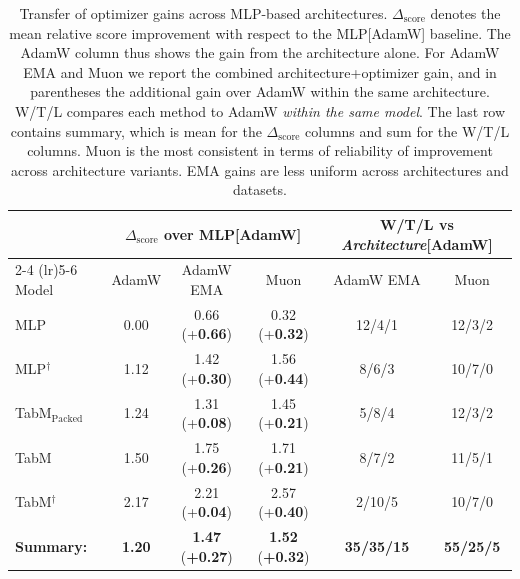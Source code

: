 \begin{table}[h]
\centering
\caption{
Transfer of optimizer gains across MLP-based architectures. $\Delta_{\mathrm{score}}$
denotes the mean relative score improvement with respect to the MLP[AdamW]
baseline. The AdamW column thus shows the gain from the architecture alone. For
AdamW EMA and Muon we report the combined architecture+optimizer gain, and in
parentheses the additional gain over AdamW within the same architecture. W/T/L
compares each method to AdamW \textit{within the same model}. The last row
contains summary, which is mean for the $\Delta_{\mathrm{score}}$ columns and sum for
the W/T/L columns. Muon is the most consistent in terms of reliability of
improvement across architecture variants. EMA gains are less uniform across
architectures and datasets.}
\label{tab:optimizer-transfer}
\small
\setlength{\tabcolsep}{5pt}
\renewcommand{\arraystretch}{1.08}
\begin{tabular}{@{}lccc@{\hspace{16pt}}cc@{}}
\toprule
& \multicolumn{3}{c}{$\Delta_{\mathrm{score}}$ over MLP[AdamW]} & \multicolumn{2}{c}{W/T/L vs \textit{Architecture}[AdamW]} \\
\cmidrule(lr){2-4} \cmidrule(lr){5-6}
Model & AdamW & AdamW {\scriptsize EMA} & Muon & AdamW {\scriptsize EMA} & Muon \\
\midrule
MLP & 0.00 & 0.66 {\scriptsize (\textcolor{OliveGreen}{+\textbf{0.66}})} & 0.32 {\scriptsize (\textcolor{OliveGreen}{+\textbf{0.32}})} & 12/4/1 & 12/3/2 \\
MLP$^\dagger$ & 1.12 & 1.42 {\scriptsize (\textcolor{OliveGreen}{+\textbf{0.30}})} & 1.56 {\scriptsize (\textcolor{OliveGreen}{+\textbf{0.44}})} & 8/6/3 & 10/7/0 \\
TabM$_{\text{Packed}}$ & 1.24 & 1.31 {\scriptsize (\textcolor{OliveGreen}{+\textbf{0.08}})} & 1.45 {\scriptsize (\textcolor{OliveGreen}{+\textbf{0.21}})} & 5/8/4 & 12/3/2 \\
TabM & 1.50 & 1.75 {\scriptsize (\textcolor{OliveGreen}{+\textbf{0.26}})} & 1.71 {\scriptsize (\textcolor{OliveGreen}{+\textbf{0.21}})} & 8/7/2 & 11/5/1 \\
TabM$^\dagger$ & 2.17 & 2.21 {\scriptsize (\textcolor{OliveGreen}{+\textbf{0.04}})} & 2.57 {\scriptsize (\textcolor{OliveGreen}{+\textbf{0.40}})} & 2/10/5 & 10/7/0 \\
\midrule
\textbf{Summary:} & \textbf{1.20} & \textbf{1.47} {\scriptsize (\textbf{\textcolor{OliveGreen}{+\textbf{0.27}}})} & \textbf{1.52} {\scriptsize (\textbf{\textcolor{OliveGreen}{+\textbf{0.32}}})} & \textbf{35/35/15} & \textbf{55/25/5} \\
\bottomrule
\end{tabular}
\end{table}